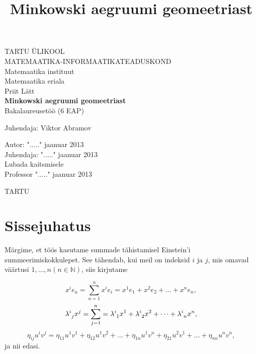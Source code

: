 \documentclass[a4paper,12pt]{article}
\title{Minkowski aegruumi geomeetriast}
\numberwithin{equation}{section}
\begin{document}
\begin{titlepage}
\begin{center}

{\large TARTU ÜLIKOOL}\\[0.3cm]
{\large MATEMAATIKA-INFORMAATIKATEADUSKOND}\\[0.3cm]
{\large Matemaatika instituut}\\[0.3cm]
{\large Matemaatika eriala}\\[3cm]

{\large Priit Lätt}\\[0.3cm]
{\huge \textbf{Minkowski aegruumi geomeetriast}}\\[0.3cm]
{\large Bakalaureusetöö (6 EAP)}\\[3cm]

\begin{flushright}
{\large Juhendaja: Viktor Abramov}
\end{flushright}

\vfill

\begin{flushleft}
{\large
Autor: \dotfill "....." jaanuar 2013\\
Juhendaja: \dotfill "....." jaanuar 2013\\[0.5cm]
Lubada kaitsmisele\\
Professor \dotfill "....." jaanuar 2013\\[3cm]
}
\end{flushleft}
{\large TARTU \the\year}

\end{center}
\end{titlepage}

\tableofcontents
\newpage

\section*{Sissejuhatus}
Märgime, et töös kasutame summade tähistamisel Einstein'i summeerimiskokkulepet. See tähendab, kui meil on indeksid $i$ ja $j$, mis omavad väärtusi $1, \dots, n \left( n \in \mathbb{N} \right)$, siis kirjutame 


\[ x^{i} e_{a} = \sum_{a=1}^{n} x^{i} e_{i} = x^{1} e_{1} + x^{2} e_{2} + \dots + x^{n} e_{n},\]
\[ \lambda\indices{^i_j} x^{j} = \sum_{j=1}^{n} = \lambda\indices{^i_1} x^{1} + \lambda\indices{^i_2} x^{2} + \dots +\lambda\indices{^i_n} x^{n}, \]
\[ \eta_{ij} u^{i} v^{j} = \eta_{11} u^{1} v^{1} + \eta_{12} u^{1} v^{2} + \dots + \eta_{1n} u^{1} v^{n} + \eta_{21} u^{2} v^{1} + \dots + \eta_{nn} u^{n} v^{n}, \]
ja nii edasi.
\end{document}
